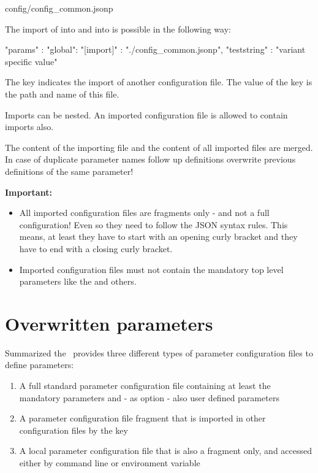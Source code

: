 \begin{pythonlog}
config/config_common.jsonp
\end{pythonlog}

The import of  into  and into  is possible in the following way:

\begin{pythonlog}
"params" : {
            "global": {
                       "[import]"   : "./config_common.jsonp",
                       "teststring" : "variant specific value"
                      }
           }
\end{pythonlog}

The key \pcode{[import]} indicates the import of another configuration file. The value of the key is the path and name of this file.

Imports can be nested. An imported configuration file is allowed to contain imports also.

The content of the importing file and the content of all imported files are merged. In case of duplicate parameter names follow up definitions
overwrite previous definitions of the same parameter!

\textbf{Important:}

\begin{itemize}
   \item All imported configuration files are fragments only - and not a full configuration! Even so they need to follow the JSON syntax rules.
         This means, at least they have to start with an opening curly bracket and they have to end with a closing curly bracket.
   \item Imported configuration files must not contain the mandatory top level parameters like the  and others.
\end{itemize}

\newpage

\section{Overwritten parameters}

Summarized the \pkg\ provides three different types of parameter configuration files to define parameters:

\begin{enumerate}
   \item A full standard parameter configuration file containing at least the mandatory parameters and - as option - also user defined parameters
   \item A parameter configuration file fragment that is imported in other configuration files by the \pcode{[import]} key
   \item A local parameter configuration file that is also a fragment only, and accessed either by command line or environment variable
\end{enumerate}

